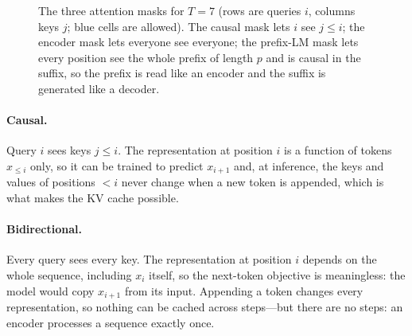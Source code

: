 \begin{figure}[t]
\centering
{}
\caption{The three attention masks for $T=7$ (rows are queries $i$, columns keys $j$; blue cells are
allowed). The causal mask lets $i$ see $j\le i$; the encoder mask lets everyone see everyone; the
prefix-LM mask lets every position see the whole prefix of length $p$ and is causal in the suffix,
so the prefix is read like an encoder and the suffix is generated like a decoder.}
\label{fig:encoders:masks}
\end{figure}

\paragraph{Causal.} Query $i$ sees keys $j\le i$. The representation at position $i$ is a function of
tokens $x_{\le i}$ only, so it can be trained to predict $x_{i+1}$ and, at inference, the keys and
values of positions $<i$ never change when a new token is appended, which is what makes the KV cache
possible.

\paragraph{Bidirectional.} Every query sees every key. The representation at position $i$ depends on
the whole sequence, including $x_i$ itself, so the next-token objective is meaningless: the model
would copy $x_{i+1}$ from its input. Appending a token changes every representation, so nothing can
be cached across steps---but there are no steps: an encoder processes a sequence exactly once.


